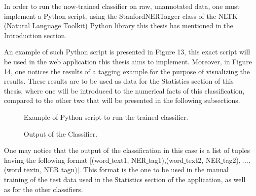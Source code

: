 \documentclass[12pt,a4paper]{article}
\begin{document}
\qquad In order to run the now-trained classifier on raw, unannotated data, one must implement a Python script, using the StanfordNERTagger class of the NLTK (Natural Language Toolkit) Python library this thesis has mentioned in the Introduction section.

\qquad An example of such Python script is presented in Figure 13, this exact script will be used in the web application this thesis aims to implement. Moreover, in Figure 14, one notices the results of a tagging example for the purpose of visualizing the results. These results are to be used as data for the Statistics section of this thesis, where one will be introduced to the numerical facts of this classification, compared to the other two that will be presented in the following subsections.

\begin{figure}[h!]
\begin{center}
\end{center}
\caption{Example of Python script to run the trained classifier.}
\end{figure}

\begin{figure}[h!]
\begin{center}
\end{center}
\caption{Output of the Classifier.}
\end{figure}

\qquad One may notice that the output of the classification in this case is a list of tuples having the following format [(word$\_$text1, NER$\_$tag1),(word$\_$text2, NER$\_$tag2), ..., (word$\_$textn, NER$\_$tagn)]. This format is the one to be used in the manual training of the test data used in the Statistics section of the application, as well as for the other classifiers.
\end{document}
